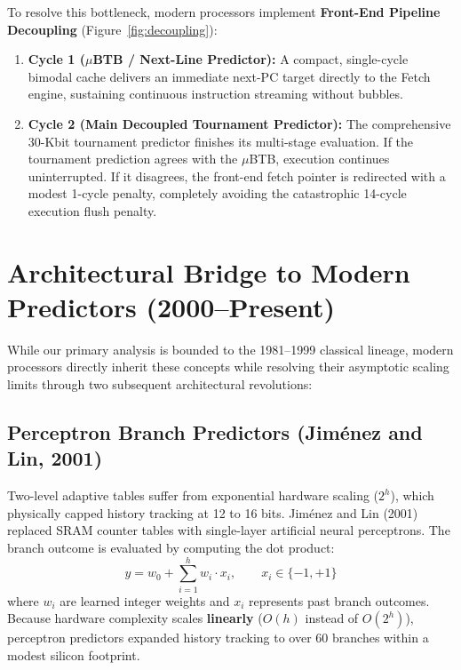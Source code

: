 \documentclass[11pt,a4paper]{article}
\begin{document}
To resolve this bottleneck, modern processors implement \textbf{Front-End Pipeline Decoupling} (Figure~\ref{fig:decoupling}):
\begin{enumerate}[leftmargin=1.8em, itemsep=0.3em]
    \item \textbf{Cycle 1 ($\mu$BTB / Next-Line Predictor):} A compact, single-cycle bimodal cache delivers an immediate next-PC target directly to the Fetch engine, sustaining continuous instruction streaming without bubbles.
    \item \textbf{Cycle 2 (Main Decoupled Tournament Predictor):} The comprehensive 30-Kbit tournament predictor finishes its multi-stage evaluation. If the tournament prediction agrees with the $\mu$BTB, execution continues uninterrupted. If it disagrees, the front-end fetch pointer is redirected with a modest 1-cycle penalty, completely avoiding the catastrophic 14-cycle execution flush penalty.
\end{enumerate}

\section{Architectural Bridge to Modern Predictors (2000--Present)}
\label{sec:modern_bridge}

While our primary analysis is bounded to the 1981--1999 classical lineage, modern processors directly inherit these concepts while resolving their asymptotic scaling limits through two subsequent architectural revolutions:

\subsection{Perceptron Branch Predictors (Jiménez and Lin, 2001)}
Two-level adaptive tables suffer from exponential hardware scaling ($2^h$), which physically capped history tracking at 12 to 16 bits. Jiménez and Lin (2001)~\cite{jimenez2001} replaced SRAM counter tables with single-layer artificial neural perceptrons. The branch outcome is evaluated by computing the dot product:
\begin{equation}
    y = w_0 + \sum_{i=1}^{h} w_i \cdot x_i, \qquad x_i \in \{-1, +1\}
    \label{eq:perceptron}
\end{equation}
where $w_i$ are learned integer weights and $x_i$ represents past branch outcomes. Because hardware complexity scales \textbf{linearly} ($O(h)$ instead of $O(2^h)$), perceptron predictors expanded history tracking to over 60 branches within a modest silicon footprint.
\end{document}
